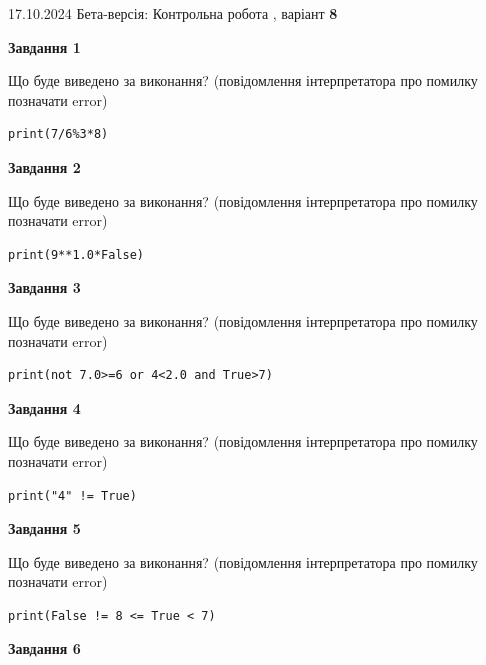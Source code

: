 \documentclass[12pt, ukrainian]{article}
\begin{document}
{\Large{17.10.2024 Бета-версія: Контрольна робота , варіант  \No \textbf { 8 }\par}}
{
\begin {large}
{\begin {center}\textbf{Завдання 1}\end {center}}

Що буде виведено за виконання? (повідомлення інтерпретатора про помилку позначати error)\par
\begin{verbatim}
print(7/6%3*8)
\end{verbatim}

{\begin {center}\textbf{Завдання 2}\end {center}}

Що буде виведено за виконання? (повідомлення інтерпретатора про помилку позначати error)\par
\begin{verbatim}
print(9**1.0*False)
\end{verbatim}

{\begin {center}\textbf{Завдання 3}\end {center}}

Що буде виведено за виконання? (повідомлення інтерпретатора про помилку позначати error)\par
\begin{verbatim}
print(not 7.0>=6 or 4<2.0 and True>7)
\end{verbatim}

{\begin {center}\textbf{Завдання 4}\end {center}}

Що буде виведено за виконання? (повідомлення інтерпретатора про помилку позначати error)\par
\begin{verbatim}
print("4" != True)
\end{verbatim}

{\begin {center}\textbf{Завдання 5}\end {center}}

Що буде виведено за виконання? (повідомлення інтерпретатора про помилку позначати error)\par
\begin{verbatim}
print(False != 8 <= True < 7)
\end{verbatim}

{\begin {center}\textbf{Завдання 6}\end {center}}


\end{large}}
\end{document}
